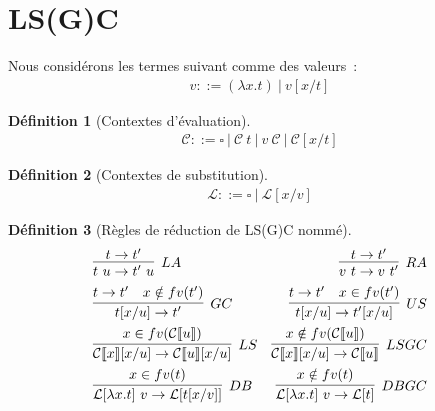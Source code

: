 \documentclass[11pt,a4paper]{article}
\theoremstyle{definition}
\newtheorem{definition}{Définition}[section]
\begin{document}
\section{LS(G)C}
Nous considérons les termes suivant comme des valeurs~:
\begin{align*}
    v ::= (\lambda x.t)~|~v[x/t]
\end{align*}
\begin{definition}[Contextes d'évaluation]
\begin{align*}
    \mathcal{C} ::= \square~|~\mathcal{C}~t~|~v~\mathcal{C}~|~\mathcal{C}[x/t]
\end{align*}
\end{definition}
\begin{definition}[Contextes de substitution]
\begin{align*}
  \mathcal{L} ::= \square~|~\mathcal{L}[x/v]
\end{align*}
\end{definition}

\begin{definition}[Règles de réduction de LS(G)C nommé]
      \begin{align*}
    &\infer[LA]{t~u\rightarrow t'~u}{t \rightarrow t'}
 &\infer[RA]{v~t\rightarrow v~t'}{t \rightarrow t'}\\
&\infer[GC]{t[x/u]\rightarrow t'}{t \rightarrow t' & x \notin fv(t') }
&\infer[US]{t[x/u]\rightarrow t'[x/u]}{t \rightarrow t' & x \in fv(t')}\\
&\infer[LS]{\mathcal{C}\llbracket x \rrbracket [x/u]\rightarrow \mathcal{C}\llbracket u \rrbracket [x/u]}{x \in fv(\mathcal{C}\llbracket u \rrbracket) }
&\infer[LSGC]{\mathcal{C}\llbracket x \rrbracket [x/u]\rightarrow \mathcal{C}\llbracket u \rrbracket}{x \notin fv(\mathcal{C}\llbracket u \rrbracket) }\\
&\infer[DB]{\mathcal{L}[\lambda x.t]~v \rightarrow \mathcal{L}[t[x/v]]}{x\in fv(t)}
&\infer[DBGC]{\mathcal{L}[\lambda x.t]~v \rightarrow \mathcal{L}[t]}{x\notin fv(t)}
\end{align*}
\end{definition}
\end{document}
